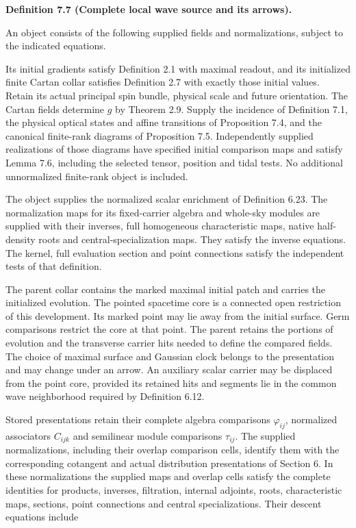 \documentclass[
  english,
  11pt,
  reqno]{amsart}
\makeatletter
\newcommand{\pandocstatementheading}[1]{%
  \par\addpenalty{\@beginparpenalty}%
  \addvspace{.5\baselineskip plus .2\baselineskip minus .2\baselineskip}%
  {\normalfont\bfseries #1\par}%
  \nobreak\@afterindenttrue\@afterheading
}
\makeatother
\begin{document}
\pandocstatementheading{\leavevmode{}\label{def:online-complete-independent-wave-source}Definition 7.7 (Complete local wave source and its arrows).}

An object consists of the following supplied fields and normalizations,
subject to the indicated equations.

Its initial gradients satisfy Definition 2.1 with maximal readout, and
its initialized finite Cartan collar satisfies Definition 2.7 with
exactly those initial values. Retain its actual principal spin bundle,
physical scale and future orientation. The Cartan fields determine \(g\)
by Theorem 2.9. Supply the incidence of Definition 7.1, the physical
optical states and affine transitions of Proposition 7.4, and the
canonical finite-rank diagrams of Proposition 7.5. Independently
supplied realizations of those diagrams have specified initial
comparison maps and satisfy Lemma 7.6, including the selected tensor,
position and tidal tests. No additional unnormalized finite-rank object
is included.

The object supplies the normalized scalar enrichment of Definition 6.23.
The normalization maps for its fixed-carrier algebra and whole-sky
modules are supplied with their inverses, full homogeneous
characteristic maps, native half-density roots and
central-specialization maps. They satisfy the inverse equations. The
kernel, full evaluation section and point connections satisfy the
independent tests of that definition.

The parent collar contains the marked maximal initial patch and carries
the initialized evolution. The pointed spacetime core is a connected
open restriction of this development. Its marked point may lie away from
the initial surface. Germ comparisons restrict the core at that point.
The parent retains the portions of evolution and the transverse carrier
hits needed to define the compared fields. The choice of maximal surface
and Gaussian clock belongs to the presentation and may change under an
arrow. An auxiliary scalar carrier may be displaced from the point core,
provided its retained hits and segments lie in the common wave
neighborhood required by Definition 6.12.

Stored presentations retain their complete algebra comparisons
\(\varphi_{ij}\), normalized associators \(C_{ijk}\) and semilinear
module comparisons \(\tau_{ij}\). The supplied normalizations, including
their overlap comparison cells, identify them with the corresponding
cotangent and actual distribution presentations of Section 6. In these
normalizations the supplied maps and overlap cells satisfy the complete
identities for products, inverses, filtration, internal adjoints, roots,
characteristic maps, sections, point connections and central
specializations. Their descent equations include
\end{document}
